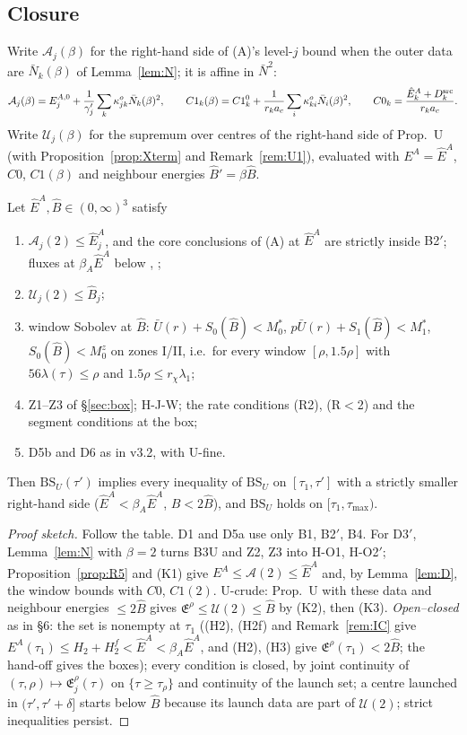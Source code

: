 \documentclass[11pt]{article}
\theoremstyle{definition}\newtheorem{definition}[theorem]{Definition}
\theoremstyle{remark}\newtheorem{remark}[theorem]{Remark}
\newcommand{\fn}[1]{\texttt{\detokenize{#1}}}
\newcommand{\E}{\mathfrak E}\newcommand{\B}{\mathfrak B}\newcommand{\Bh}{\hat B}\newcommand{\Eh}{\hat E^A}
\newcommand{\Nb}{\bar N}\newcommand{\oh}{\hat o}
\begin{document}
\subsection{Closure}
Write $\mathcal A_j(\beta)$ for the right-hand side of (A)'s level-$j$ bound when the outer data are $\Nb_k(\beta)$ of Lemma~\ref{lem:N}; it is affine in $\Nb^2$:
\[
\mathcal A_j(\beta)=E^{A,0}_j+\frac1{\gamma_j'}\sum_k\kappa^o_{jk}\Nb_k(\beta)^2,\qquad C1_k(\beta)=C1^0_k+\frac1{r_ka_c}\sum_i\kappa^o_{ki}\Nb_i(\beta)^2,\qquad C0_k=\frac{\Eh_k+D^{\rm src}_k}{r_ka_c}.
\]
Write $\mathcal U_j(\beta)$ for the supremum over centres of the right-hand side of Prop.~U (with Proposition~\ref{prop:Xterm} and Remark~\ref{rem:U1}), evaluated with $E^A=\Eh$, $C0$, $C1(\beta)$ and neighbour energies $\Bh'=\beta\Bh$.
\begin{proposition}[closure]\label{prop:close}
Let $\Eh,\Bh\in(0,\infty)^3$ satisfy
\begin{enumerate}[label=(K\arabic*),leftmargin=2.6em,itemsep=1pt]
\item $\mathcal A_j(2)\le\Eh_j$, and the core conclusions of (A) at $\Eh$ are strictly inside \textup{B2$'$}; fluxes at $\beta_A\Eh$ below \fn{FLUX0}, \fn{FLUX2};
\item $\mathcal U_j(2)\le\Bh_j$;
\item window Sobolev at $\Bh$: $\bar U(r)+S_0(\Bh)<M_0^*$, $p\bar U(r)+S_1(\Bh)<M_1^*$, $S_0(\Bh)<M_0^z$ on zones I/II, i.e.\ for every window $[\rho,1.5\rho]$ with $56\lambda(\tau)\le\rho$ and $1.5\rho\le r_\chi\lambda_1$;
\item \textup{Z1--Z3} of \S\ref{sec:box}; H-J-W; the rate conditions \textup{(R2)}, \textup{(R$<$2)} and the segment conditions at the box;
\item D5b and D6 as in v3.2, with U-fine.
\end{enumerate}
Then $\mathrm{BS}_U(\tau')$ implies every inequality of $\mathrm{BS}_U$ on $[\tau_1,\tau']$ with a strictly smaller right-hand side ($\Eh<\beta_A\Eh$, $\Bh<2\Bh$), and $\mathrm{BS}_U$ holds on $[\tau_1,\tau_{\max})$.
\end{proposition}
\begin{proof}[Proof sketch]
Follow the table. D1 and D5a use only B1, B2$'$, B4. For D3$'$, Lemma~\ref{lem:N} with $\beta=2$ turns B3U and Z2, Z3 into H-O1, H-O2$'$; Proposition~\ref{prop:R5} and (K1) give $E^A\le\mathcal A(2)\le\Eh$ and, by Lemma~\ref{lem:D}, the window bounds with $C0$, $C1(2)$. U-crude: Prop.~U with these data and neighbour energies $\le2\Bh$ gives $\E^\rho\le\mathcal U(2)\le\Bh$ by (K2), then (K3). \emph{Open--closed} as in \fn{launch_lemma.tex} \S6: the set is nonempty at $\tau_1$ ((H2), (H2f) and Remark~\ref{rem:IC} give $E^A(\tau_1)\le H_2+H_2^f<\Eh<\beta_A\Eh$, and (H2), (H3) give $\E^\rho(\tau_1)<2\Bh$; the hand-off gives the boxes); every condition is closed, by joint continuity of $(\tau,\rho)\mapsto\E^\rho_j(\tau)$ on $\{\tau\ge\tau_\rho\}$ and continuity of the launch set; a centre launched in $(\tau',\tau'+\delta]$ starts below $\Bh$ because its launch data are part of $\mathcal U(2)$; strict inequalities persist.
\end{proof}
\end{document}
